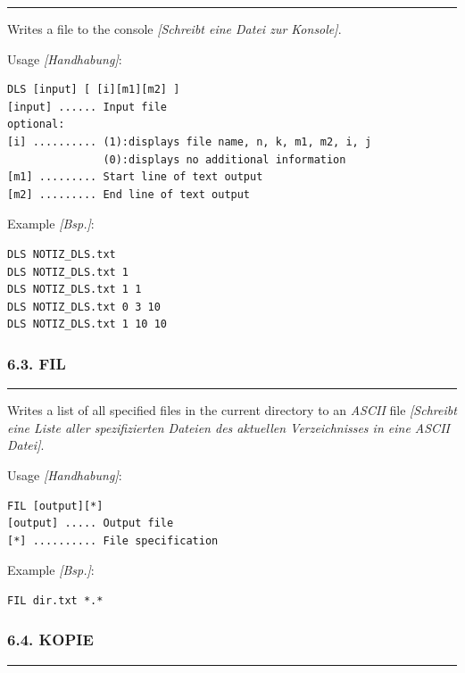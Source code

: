 \documentclass[
]{article}
\begin{document}
\begin{center}\rule{0.5\linewidth}{0.5pt}\end{center}

Writes a file to the console \emph{{[}Schreibt eine Datei zur
Konsole{]}}.

Usage \emph{{[}Handhabung{]}}:

\begin{verbatim}
DLS [input] [ [i][m1][m2] ]
[input] ...... Input file 
optional:
[i] .......... (1):displays file name, n, k, m1, m2, i, j 
               (0):displays no additional information
[m1] ......... Start line of text output 
[m2] ......... End line of text output
\end{verbatim}

Example \emph{{[}Bsp.{]}}:

\begin{verbatim}
DLS NOTIZ_DLS.txt
DLS NOTIZ_DLS.txt 1
DLS NOTIZ_DLS.txt 1 1
DLS NOTIZ_DLS.txt 0 3 10
DLS NOTIZ_DLS.txt 1 10 10
\end{verbatim}

\hypertarget{fil}{%
\subsubsection{6.3. FIL}\label{fil}}

\begin{center}\rule{0.5\linewidth}{0.5pt}\end{center}

Writes a list of all specified files in the current directory to an
\emph{ASCII} file \emph{{[}Schreibt eine Liste aller spezifizierten
Dateien des aktuellen Verzeichnisses in eine ASCII Datei{]}}.

Usage \emph{{[}Handhabung{]}}:

\begin{verbatim}
FIL [output][*] 
[output] ..... Output file 
[*] .......... File specification
\end{verbatim}

Example \emph{{[}Bsp.{]}}:

\begin{verbatim}
FIL dir.txt *.*
\end{verbatim}

\hypertarget{kopie}{%
\subsubsection{6.4. KOPIE}\label{kopie}}

\begin{center}\rule{0.5\linewidth}{0.5pt}\end{center}
\end{document}
